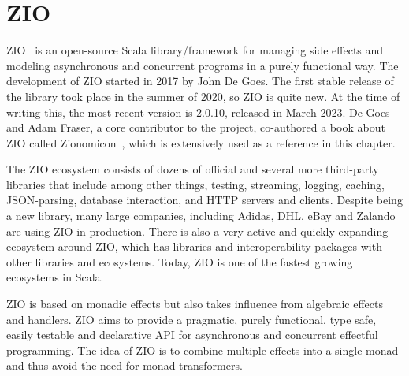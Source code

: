 \chapter{ZIO} \label{zio}

ZIO~\cite{zio} is an open-source Scala library/framework for managing side effects and modeling asynchronous and concurrent programs in a purely functional way. The development of ZIO started in 2017 by John De Goes. The first stable release of the library took place in the summer of 2020, so ZIO is quite new. At the time of writing this, the most recent version is 2.0.10, released in March 2023. De Goes and Adam Fraser, a core contributor to the project, co-authored a book about ZIO called Zionomicon~\cite{zionomicon}, which is extensively used as a reference in this chapter.

The ZIO ecosystem consists of dozens of official and several more third-party libraries that include among other things, testing, streaming, logging, caching, JSON-parsing, database interaction, and HTTP servers and clients. Despite being a new library, many large companies, including Adidas, DHL, eBay and Zalando are using ZIO in production. There is also a very active and quickly expanding ecosystem around ZIO, which has libraries and interoperability packages with other libraries and ecosystems. Today, ZIO is one of the fastest growing ecosystems in Scala.

ZIO is based on monadic effects but also takes influence from algebraic effects and handlers. ZIO aims to provide a pragmatic, purely functional, type safe, easily testable and declarative API for asynchronous and concurrent effectful programming. The idea of ZIO is to combine multiple effects into a single monad and thus avoid the need for monad transformers.

